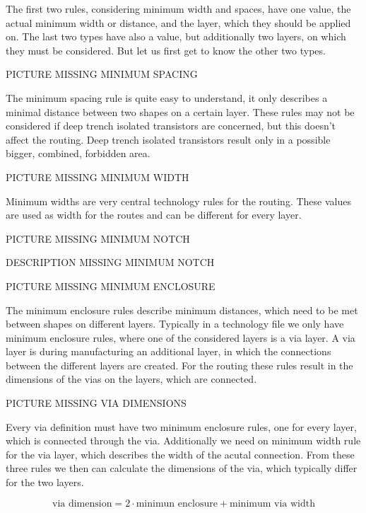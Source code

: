 The first two rules, considering minimum width and spaces, have one value, the actual minimum width or distance, and the layer, which they should be applied on. The last two types have also a value, but additionally two layers, on which they must be considered. But let us first get to know the other two types.

PICTURE MISSING MINIMUM SPACING

The minimum spacing rule is quite easy to understand, it only describes a minimal distance between two shapes on a certain layer. These rules may not be considered if deep trench isolated transistors are concerned, but this doesn't affect the routing. Deep trench isolated transistors result only in a possible bigger, combined, forbidden area.

PICTURE MISSING MINIMUM WIDTH

Minimum widths are very central technology rules for the routing. These values are used as width for the routes and can be different for every layer.

PICTURE MISSING MINIMUM NOTCH

DESCRIPTION MISSING MINIMUM NOTCH

PICTURE MISSING MINIMUM ENCLOSURE

The minimum enclosure rules describe minimum distances, which need to be met between shapes on different layers. Typically in a technology file we only have minimum enclosure rules, where one of the considered layers is a via layer. A via layer is during manufacturing an additional layer, in which the connections between the different layers are created. For the routing these rules result in the dimensions of the vias on the layers, which are connected.

PICTURE MISSING VIA DIMENSIONS

Every via definition must have two minimum enclosure rules, one for every layer, which is connected through the via. Additionally we need on minimum width rule for the via layer, which describes the width of the acutal connection. From these three rules we then can calculate the dimensions of the via, which typically differ for the two layers.

\[\text{via dimension} = 2 \cdot \text{minimun enclosure} + \text{minimum via width}\]
